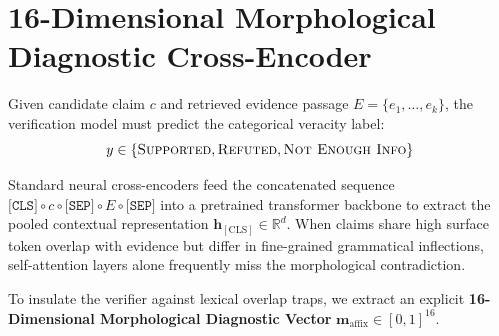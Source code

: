 \section[16-Dimensional Morphological Cross-Encoder]{16-Dimensional Morphological Diagnostic Cross-Encoder}
\label{sec:morpho_cross_encoder}

Given candidate claim $c$ and retrieved evidence passage $E = \{e_1, \dots, e_k\}$, the verification model must predict the categorical veracity label:
\begin{equation}
    y \in \{\textsc{Supported}, \textsc{Refuted}, \textsc{Not Enough Info}\}
\end{equation}

Standard neural cross-encoders feed the concatenated sequence $\texttt{[CLS]} \circ c \circ \texttt{[SEP]} \circ E \circ \texttt{[SEP]}$ into a pretrained transformer backbone to extract the pooled contextual representation $\mathbf{h}_{[\text{CLS}]} \in \mathbb{R}^d$. When claims share high surface token overlap with evidence but differ in fine-grained grammatical inflections, self-attention layers alone frequently miss the morphological contradiction.

To insulate the verifier against lexical overlap traps, we extract an explicit \textbf{16-Dimensional Morphological Diagnostic Vector} $\mathbf{m}_{\text{affix}} \in [0, 1]^{16}$.

